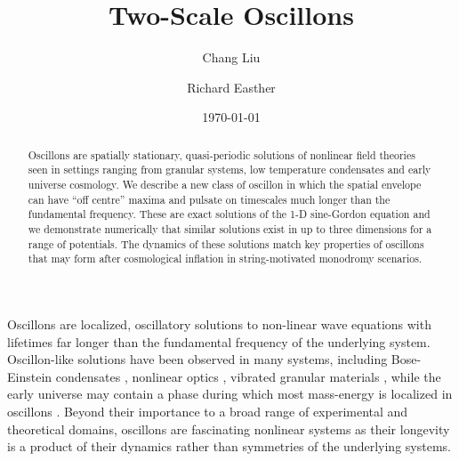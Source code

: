 \documentclass[%
reprint,
superscriptaddress,
amsmath,amssymb,
aps,
prl,
floatfix,
nofootinbib
]{revtex4-1}
\begin{document}
\title{Two-Scale Oscillons}
\author{Chang Liu}
\author{Richard Easther}

\date{\today}

\begin{abstract} \noindent
Oscillons are spatially stationary, quasi-periodic solutions of nonlinear field theories seen in settings ranging from granular systems, low temperature condensates and  early universe cosmology. We describe a new class of oscillon in which the spatial envelope can have ``off centre'' maxima and pulsate on timescales much longer than the fundamental frequency. These  are exact solutions of the 1-D sine-Gordon equation and we demonstrate numerically that similar solutions exist in up to three dimensions for a range of potentials. The dynamics of these solutions match key properties of  oscillons that may form after cosmological inflation in string-motivated monodromy scenarios.
\end{abstract}

\maketitle

\noindent
Oscillons are localized, oscillatory solutions to non-linear wave equations with  lifetimes far longer than the  fundamental frequency of the underlying system. Oscillon-like solutions have been observed in many systems, including Bose-Einstein condensates \cite{PhysRevA.91.023631}, nonlinear optics \cite{PhysRevLett.108.093901}, vibrated granular materials \cite{Copeland:1995fq,Tsimring:1997zz}, while the  early universe may contain a phase during which most mass-energy is localized in oscillons   \cite{Copeland:1995fq,Hindmarsh:2006ur,Hindmarsh:2007jb,Amin:2010dc,Amin:2010xe,Gleiser:2011xj,Amin:2011hj,Zhou:2013tsa,Amin:2013ika}. Beyond their importance to a broad range of experimental and theoretical domains, oscillons are fascinating  nonlinear systems as their longevity is a product of their  dynamics \cite{Copeland:1995fq,PhysRevD.80.125037} rather than  symmetries of the underlying systems.     

\end{document}
